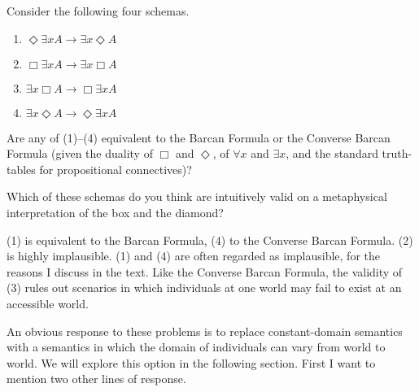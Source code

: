 \begin{exercise}
  Consider the following four schemas.
  \begin{enumerate}[leftmargin=14mm]
    \itemsep-1mm
  \item[(1)] $\Diamond \exists x A \to \exists x \Diamond A$
  \item[(2)] $\Box \exists x A \to \exists x \Box A$
  \item[(3)] $\exists x \Box A \to \Box \exists x A$
  \item[(4)] $\exists x \Diamond A \to \Diamond \exists x A$
  \end{enumerate}
  \vspace{-3mm}
  \begin{exlist}
    \item Are any of (1)--(4) equivalent to the Barcan Formula or the Converse
    Barcan Formula (given the duality of $\Box$ and $\Diamond$, of $\forall x$
    and $\exists x$, and the standard truth-tables for propositional
    connectives)?
    \item Which of these schemas do you think are intuitively valid on a
    metaphysical interpretation of the box and the diamond?
  \end{exlist}
\end{exercise}
\begin{solution}
  (1) is equivalent to the Barcan Formula, (4) to the Converse Barcan Formula.
  (2) is highly implausible. (1) and (4) are often regarded as implausible, for
  the reasons I discuss in the text. Like the Converse Barcan Formula, the
  validity of (3) rules out scenarios in which individuals at one world may fail
  to exist at an accessible world.
\end{solution}  
  

An obvious response to these problems is to replace constant-domain semantics
with a semantics in which the domain of individuals can vary from world to
world. We will explore this option in the following section. First I want to
mention two other lines of response.

